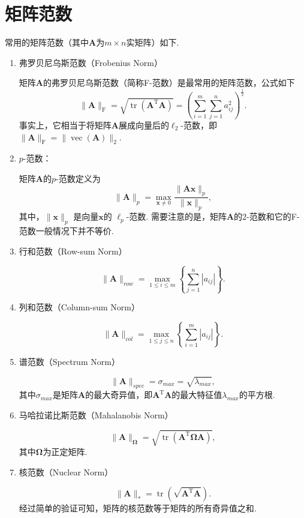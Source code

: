 \section{矩阵范数}

常用的矩阵范数（其中\( \mathbf{A} \)为\( m \times n \)实矩阵）如下.

\begin{enumerate}[leftmargin=0em, listparindent=2em, itemindent=2em]
    \item 弗罗贝尼乌斯范数（Frobenius Norm）

          矩阵\( \mathbf{A} \)的弗罗贝尼乌斯范数（简称F-范数）是最常用的矩阵范数，公式如下
          \[
              \|\mathbf{A}\|_{\mathrm{F}} = \sqrt{\operatorname{tr}(\mathbf{A}^{\mathrm{T}}\mathbf{A})} = \left(\sum_{i=1}^m \sum_{j=1}^n a_{ij}^2\right)^{\frac{1}{2}}.
          \]
          事实上，它相当于将矩阵\( \mathbf{A} \)展成向量后的$\ell_2$-范数，即 $\|\mathbf{A}\|_{\mathrm{F}} = \|\operatorname{vec}(\mathbf{A})\|_2$.
    \item $p$-范数：

          矩阵\( \mathbf{A} \)的$p$-范数定义为
          \[
              \|\mathbf{A}\|_p = \max_{\bm{x} \neq 0} \frac{\|\mathbf{A}\bm{x}\|_p}{\|\bm{x}\|_p},
          \]
          其中，$\|\bm{x}\|_p$ 是向量\( \bm{x} \)的 \( \ell_p \)-范数. 需要注意的是，矩阵\( \mathbf{A} \)的2-范数和它的F-范数一般情况下并不等价.
    \item 行和范数（Row-sum Norm）

          \[
              \|\mathbf{A}\|_{row} = \max_{1\leq i\leq m} \left\{\sum_{j=1}^n |a_{ij}|\right\}.
          \]

    \item 列和范数（Column-sum Norm）

          \[
              \|\mathbf{A}\|_{col} = \max_{1\leq j\leq n} \left\{\sum_{i=1}^m |a_{ij}|\right\}.
          \]

    \item 谱范数（Spectrum Norm）

          \[
              \|\mathbf{A}\|_{spec} = \sigma_{max} = \sqrt{\lambda_{max}},
          \]
          其中$\sigma_{max}$是矩阵\( \mathbf{A} \)的最大奇异值，即$\mathbf{A}^{\mathrm{T}}\mathbf{A}$的最大特征值$\lambda_{max}$的平方根.

    \item 马哈拉诺比斯范数（Mahalanobis Norm）

          \[
              \|\mathbf{A}\|_{\mathbf{\Omega}} = \sqrt{\operatorname{tr}(\mathbf{A}^{\mathrm{T}}\mathbf{\Omega} \mathbf{A})},
          \]
          其中$\mathbf{\Omega}$为正定矩阵.

    \item 核范数（Nuclear Norm）

          \[
              \|\mathbf{A}\|_* = \operatorname{tr}(\sqrt{\mathbf{A}^{\mathrm{T}}\mathbf{A}}).
          \]
          经过简单的验证可知，矩阵的核范数等于矩阵的所有奇异值之和.
\end{enumerate}


